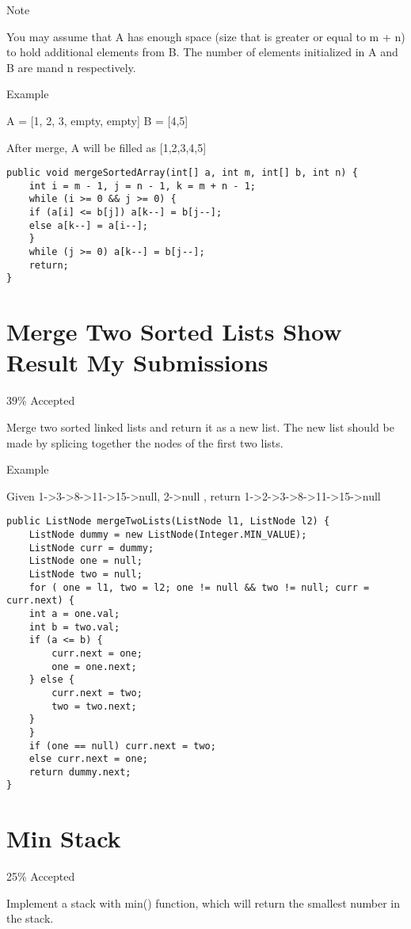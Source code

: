 \documentclass[12pt]{book}
\begin{document}
Note

You may assume that A has enough space (size that is greater or equal to m + n) to hold additional elements from B. The number of elements initialized in A and B are mand n respectively.

Example

A = [1, 2, 3, empty, empty] B = [4,5]

After merge, A will be filled as [1,2,3,4,5]
\lstset{language=java,label= ,caption= ,numbers=none}
\begin{lstlisting}
public void mergeSortedArray(int[] a, int m, int[] b, int n) {
    int i = m - 1, j = n - 1, k = m + n - 1;
    while (i >= 0 && j >= 0) {
	if (a[i] <= b[j]) a[k--] = b[j--];
	else a[k--] = a[i--];
    }
    while (j >= 0) a[k--] = b[j--];
    return;
}
\end{lstlisting}
\chapter{Merge Two Sorted Lists Show Result My Submissions}
\label{sec-43}

39\% Accepted

Merge two sorted linked lists and return it as a new list. The new list should be made by splicing together the nodes of the first two lists.

Example

Given 1->3->8->11->15->null, 2->null , return 1->2->3->8->11->15->null
\lstset{language=java,label= ,caption= ,numbers=none}
\begin{lstlisting}
public ListNode mergeTwoLists(ListNode l1, ListNode l2) {
    ListNode dummy = new ListNode(Integer.MIN_VALUE);
    ListNode curr = dummy;
    ListNode one = null;
    ListNode two = null;
    for ( one = l1, two = l2; one != null && two != null; curr = curr.next) {
	int a = one.val;
	int b = two.val;
	if (a <= b) {
	    curr.next = one;
	    one = one.next;
	} else {
	    curr.next = two;
	    two = two.next;
	}
    }
    if (one == null) curr.next = two;
    else curr.next = one;
    return dummy.next;
}
\end{lstlisting}
\chapter{Min Stack}
\label{sec-44}

25\% Accepted

Implement a stack with min() function, which will return the smallest number in the stack.
\end{document}
